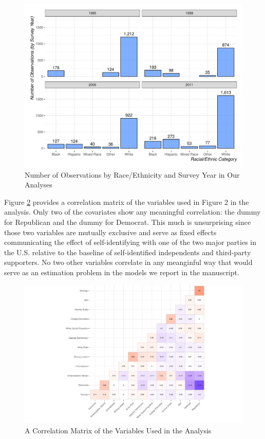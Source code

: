 \documentclass[11pt,]{article}
\begin{document}
\begin{figure}
\centering
\includegraphics{figs/barraceyear.pdf}
\caption{\label{fig:barraceyear}Number of Observations by Race/Ethnicity
and Survey Year in Our Analyses}
\end{figure}

Figure \ref{fig:corr} provides a correlation matrix of the variables
used in Figure 2 in the analysis. Only two of the covariates show any
meaningful correlation: the dummy for Republican and the dummy for
Democrat. This much is unsurprising since those two variables are
mutually exclusive and serve as fixed effects communicating the effect
of self-identifying with one of the two major parties in the U.S.
relative to the baseline of self-identified independents and third-party
supporters. No two other variables correlate in any meanginful way that
would serve as an estimation problem in the models we report in the
manuscript.

\begin{figure}
\centering
\includegraphics{figs/corr.pdf}
\caption{\label{fig:corr}A Correlation Matrix of the Variables Used in
the Analysis}
\end{figure}
\end{document}

